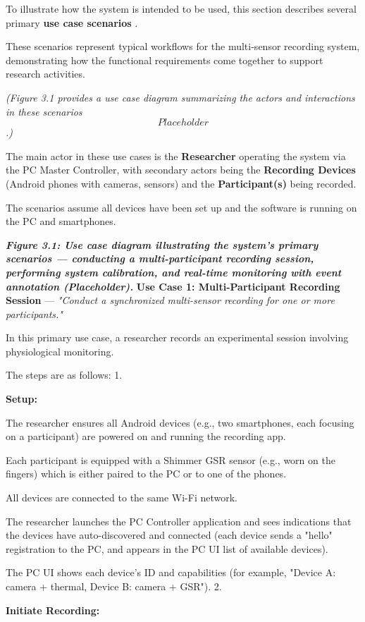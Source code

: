 To illustrate how the system is intended to be used, this section describes several primary \textbf{use case scenarios}
.

These scenarios represent typical workflows for the multi-sensor recording
system, demonstrating how the functional requirements come together to support
research activities.

\textit{(Figure 3.1 provides a use case diagram summarizing the actors and interactions in these scenarios \[Placeholder\].)}

The main actor in these use cases is the \textbf{Researcher}
operating the system via the PC Master Controller, with secondary actors being the \textbf{Recording Devices}
 (Android phones with cameras, sensors) and the \textbf{Participant(s)}
 being recorded.

The scenarios assume all devices have been set up and the software is running on
the PC and smartphones.

\textit{\textbf{Figure 3.1: Use case diagram illustrating the system's primary scenarios --- conducting a multi-participant recording session, performing system calibration, and real-time monitoring with event annotation (Placeholder).}
} \textbf{Use Case 1: Multi-Participant Recording Session}
--- \textit{"Conduct a synchronized multi-sensor recording for one or more participants."}

In this primary use case, a researcher records an experimental session involving
physiological monitoring.

The steps are as follows: 1.

\textbf{Setup:}

The researcher ensures all Android devices (e.g., two smartphones, each focusing
on a participant) are powered on and running the recording app.

Each participant is equipped with a Shimmer GSR sensor (e.g., worn on the
fingers) which is either paired to the PC or to one of the phones.

All devices are connected to the same Wi-Fi network.

The researcher launches the PC Controller application and sees indications that
the devices have auto-discovered and connected (each device sends a "hello"
registration to the PC, and appears in the PC UI list of available devices).

The PC UI shows each device's ID and capabilities (for example, "Device A:
camera + thermal, Device B: camera + GSR"). 2.

\textbf{Initiate Recording:}

